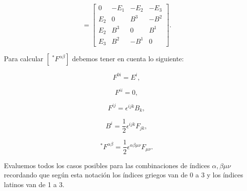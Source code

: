         \begin{equation}
            [F_{\alpha\beta}]=
            \begin{bmatrix}
                0 & -E_1 & -E_2 & -E_3 \\
                E_2 & 0 & B^3 & -B^2 \\
                E_2 & B^3 & 0 & B^1 \\
                E_3 & B^2 & -B^1 & 0
            \end{bmatrix}.
        \end{equation}

        Para calcular $[\;^*F^{\alpha\beta}]$ debemos tener en cuenta lo siguiente:

        \begin{equation}
            F^{0i}=E^i,
        \end{equation}
        
        \begin{equation}
            F^{ii} = 0,
        \end{equation}

        \begin{equation}
            F^{ij}=\epsilon^{ijk}B_k,
        \end{equation}

        \begin{equation}
            B^i = \frac{1}{2}\epsilon^{ijk}F_{jk},
        \end{equation}

        \begin{equation}
            ^*F^{\alpha\beta}=\frac{1}{2}\epsilon^{\alpha\beta\mu\nu}F_{\mu\nu}.
        \end{equation}

        Evaluemos todos los casos posibles para las combinaciones de índices $\alpha,\beta\mu\nu$ recordando que según esta notación los índices griegos van de 0 a 3 y los índices latinos van de 1 a 3.


